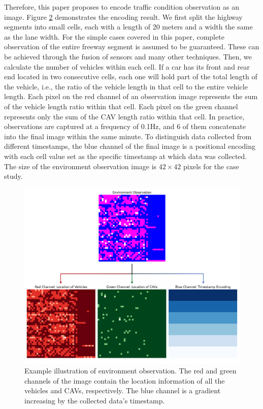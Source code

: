 \documentclass[11pt, letterpaper]{article}
\begin{document}
Therefore, this paper proposes to encode traffic condition observation as an image. Figure \hyperref[fig:2]{2} demonstrates the encoding result. We first split the highway segments into small cells, each with a length of 20 meters and a width the same as the lane width. For the simple cases covered in this paper, complete observation of the entire freeway segment is assumed to be guaranteed. These can be achieved through the fusion of sensors and many other techniques. Then, we calculate the number of vehicles within each cell. If a car has its front and rear end located in two consecutive cells, each one will hold part of the total length of the vehicle, i.e., the ratio of the vehicle length in that cell to the entire vehicle length. Each pixel on the red channel of an observation image represents the sum of the vehicle length ratio within that cell. Each pixel on the green channel represents only the sum of the CAV length ratio within that cell. In practice, observations are captured at a frequency of 0.1Hz, and 6 of them concatenate into the final image within the same minute. To distinguish data collected from different timestamps, the blue channel of the final image is a positional encoding with each cell value set as the specific timestamp at which data was collected. The size of the environment observation image is $42\times 42$ pixels for the case study.

\begin{figure}[!ht]
    \centering
    \includegraphics[width=\textwidth]{img/env_obs.png}
    \caption{Example illustration of environment observation. The red and green channels of the image contain the location information of all the vehicles and CAVs, respectively. The blue channel is a gradient increasing by the collected data's timestamp.}
    \label{fig:2}
\end{figure}
\end{document}
